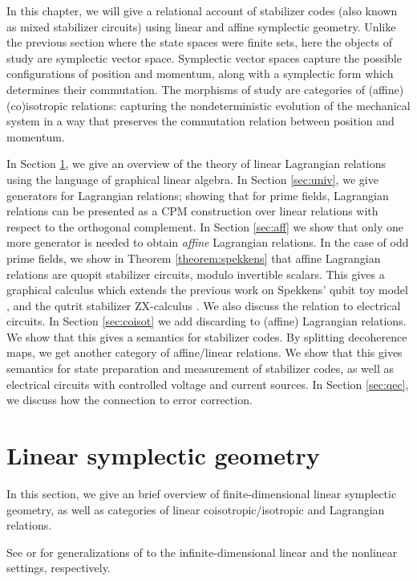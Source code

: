 
In this chapter, we will give a relational account of stabilizer codes (also known as mixed stabilizer circuits) using linear and affine symplectic geometry.
Unlike the previous section where the state spaces were finite sets, here the objects of study are symplectic vector space.  Symplectic vector spaces capture the possible configurations of position and momentum, along with a symplectic form which determines their commutation. The morphisms of study  are categories of (affine) (co)isotropic relations: capturing the nondeterministic evolution of the mechanical system in a way that preserves the commutation relation between position and momentum.

In Section \ref{sec:sym}, we give an overview of the theory of linear Lagrangian relations using the language of graphical linear algebra. In Section \ref{sec:univ}, we give generators for Lagrangian relations; showing that for prime fields, Lagrangian relations can be presented as a CPM construction over linear relations with respect to the orthogonal complement.
In Section \ref{sec:aff} we show that only one more generator is needed to obtain {\em affine} Lagrangian relations.  In the case of odd prime fields, we show in Theorem \ref{theorem:spekkens} that affine Lagrangian relations are quopit stabilizer circuits, modulo invertible scalars.  This gives  a graphical calculus which extends the previous work on Spekkens'  qubit toy model \cite{backensspek}, and the qutrit stabilizer ZX-calculus \cite{qutrit}.  We also discuss the relation to electrical circuits.
In Section \ref{sec:coisot} we add discarding to (affine) Lagrangian relations.  We show that this gives a semantics for stabilizer codes.  By splitting decoherence maps, we get another category of affine/linear relations.  We show that this gives semantics for state preparation and measurement of stabilizer codes, as well as electrical circuits with controlled voltage and current sources.  In Section \ref{sec:qec}, we discuss how the connection to error correction.

\section{Linear symplectic geometry}
\label{sec:sym}

In this section, we give an brief overview of finite-dimensional linear symplectic geometry, as well as categories of linear coisotropic/isotropic and Lagrangian relations.

See \cite{Weinstein2017} or  \cite{weinsteinsymplectic} for generalizations of to the infinite-dimensional linear and the nonlinear settings, respectively.

